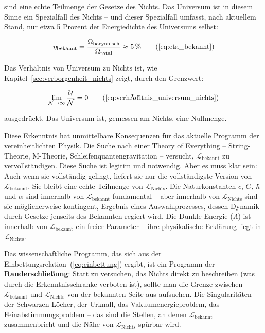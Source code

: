 ﻿\documentclass[12pt,a4paper]{report}
\begin{document}
sind eine echte Teilmenge der Gesetze des Nichts. Das Universum ist in diesem Sinne ein Spezialfall des Nichts -- und dieser Spezialfall umfasst, nach aktuellem Stand, nur etwa 5 Prozent der Energiedichte des Universums selbst:

\begin{equation}
	\eta_{\text{bekannt}} = \frac{\Omega_{\text{baryonisch}}}{\Omega_{\text{total}}} \approx 5\,\%
	\tag{\ref{eq:eta_bekannt}}
\end{equation}

Das Verhältnis von Universum zu Nichts ist, wie Kapitel~\ref{sec:verborgenheit_nichts} zeigt, durch den Grenzwert:

\begin{equation}
	\lim_{\mathcal{N} \to \infty} \frac{\mathcal{U}}{\mathcal{N}} = 0
	\tag{\ref{eq:verhältnis_universum_nichts}}
\end{equation}

ausgedrückt. Das Universum ist, gemessen am Nichts, eine Nullmenge.

Diese Erkenntnis hat unmittelbare Konsequenzen für das aktuelle Programm der vereinheitlichten Physik. Die Suche nach einer \glqq Theory of Everything\grqq{} -- String-Theorie, M-Theorie, Schleifenquantengravitation -- versucht, $\mathcal{L}_{\text{bekannt}}$ zu vervollständigen. Diese Suche ist legitim und notwendig. Aber es muss klar sein: Auch wenn sie vollständig gelingt, liefert sie nur die vollständigste Version von $\mathcal{L}_{\text{bekannt}}$. Sie bleibt eine echte Teilmenge von $\mathcal{L}_{\text{Nichts}}$. Die Naturkonstanten $c$, $G$, $\hbar$ und $\alpha$ sind innerhalb von $\mathcal{L}_{\text{bekannt}}$ fundamental -- aber innerhalb von $\mathcal{L}_{\text{Nichts}}$ sind sie möglicherweise kontingent, Ergebnis eines Auswahlprozesses, dessen Dynamik durch Gesetze jenseits des Bekannten regiert wird. Die Dunkle Energie ($\Lambda$) ist innerhalb von $\mathcal{L}_{\text{bekannt}}$ ein freier Parameter -- ihre physikalische Erklärung liegt in $\mathcal{L}_{\text{Nichts}}$.

Das wissenschaftliche Programm, das sich aus der Einbettungsrelation~(\ref{eq:einbettung}) ergibt, ist ein Programm der \textbf{Randerschließung}: Statt zu versuchen, das Nichts direkt zu beschreiben (was durch die Erkenntnisschranke verboten ist), sollte man die Grenze zwischen $\mathcal{L}_{\text{bekannt}}$ und $\mathcal{L}_{\text{Nichts}}$ von der bekannten Seite aus aufsuchen. Die Singularitäten der Schwarzen Löcher, der Urknall, das Vakuumenergieproblem, das Feinabstimmungsproblem -- das sind die Stellen, an denen $\mathcal{L}_{\text{bekannt}}$ zusammenbricht und die Nähe von $\mathcal{L}_{\text{Nichts}}$ spürbar wird.
\end{document}
